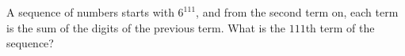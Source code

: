 A sequence of numbers starts with $6^{111}$, and from the second term on, each term is the sum of the digits of the previous term. What is the $111$th term of the sequence?
